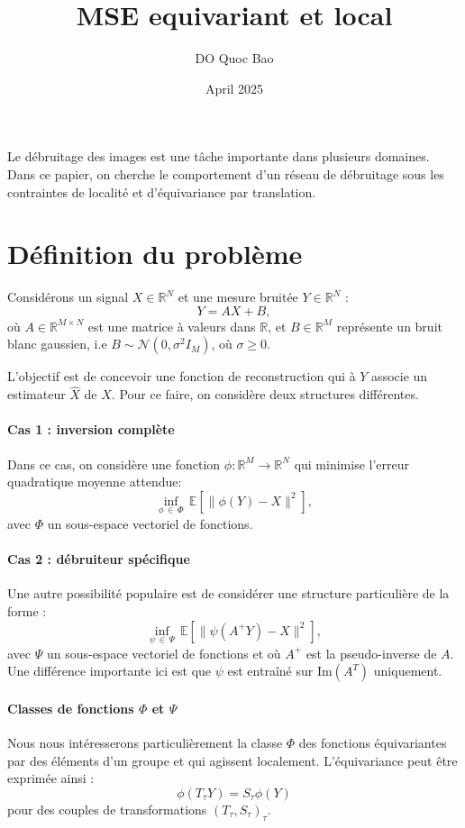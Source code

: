 \documentclass[a4paper,10pt]{article}
\title{MSE equivariant et local}
\author{DO Quoc Bao}
\date{April 2025}
\theoremstyle{definition} %
\theoremstyle{definition} %
\theoremstyle{definition} %
\theoremstyle{definition} %
\newcommand{\R}{\mathbb{R}}
\begin{document}
\maketitle

Le débruitage des images est une tâche importante dans plusieurs domaines. Dans ce papier, on cherche le comportement d'un réseau de débruitage sous les contraintes de localité et d'équivariance par translation. 

\section{Définition du problème}
Considérons un signal \( X \in \mathbb{R}^N \) et une mesure bruitée \( Y \in \mathbb{R}^N \) :  
\[
Y = A X + B,
\]  
où \( A \in \R^{M\times N} \) est une matrice à valeurs dans $\R$, et \( B \in \mathbb{R}^M \) représente un bruit blanc gaussien, i.e \( B \sim \mathcal{N}(0, \sigma^{2} I_M) \), où \( \sigma \geq 0 \).

L'objectif est de concevoir une fonction de reconstruction qui à $Y$ associe un estimateur $\hat X$ de $X$. 
Pour ce faire, on considère deux structures différentes. 

\paragraph{Cas 1 : inversion complète}
Dans ce cas, on considère une fonction \( \phi : \mathbb{R}^M \to \mathbb{R}^N \) qui minimise l'erreur quadratique moyenne attendue:  
\[
\inf_{\phi\,\in\, \Phi} \, \mathbb{E} \left[ \| \phi(Y) - X \|^2 \right],
\] 
avec $\Phi$ un sous-espace vectoriel de fonctions. 

\paragraph{Cas 2 : débruiteur spécifique}
Une autre possibilité populaire est de considérer une structure particulière de la forme :
\[
\inf_{\psi\,\in\, \Psi} \, \mathbb{E} \left[ \| \psi(A^+Y) - X \|^2 \right],
\] 
avec $\Psi$ un sous-espace vectoriel de fonctions et où $A^+$ est la pseudo-inverse de $A$. 
Une différence importante ici est que $\psi$ est entraîné sur $\mathrm{Im}(A^T)$ uniquement.

\paragraph{Classes de fonctions $\Phi$ et $\Psi$}

Nous nous intéresserons particulièrement la classe $\Phi$ des fonctions équivariantes par des éléments d'un groupe et qui agissent localement.
L'équivariance peut être exprimée ainsi :
\begin{equation}
    \phi(T_\tau Y) = S_\tau \phi(Y)
\end{equation}
pour des couples de transformations $(T_\tau, S_\tau)_{\tau}$.
\end{document}

